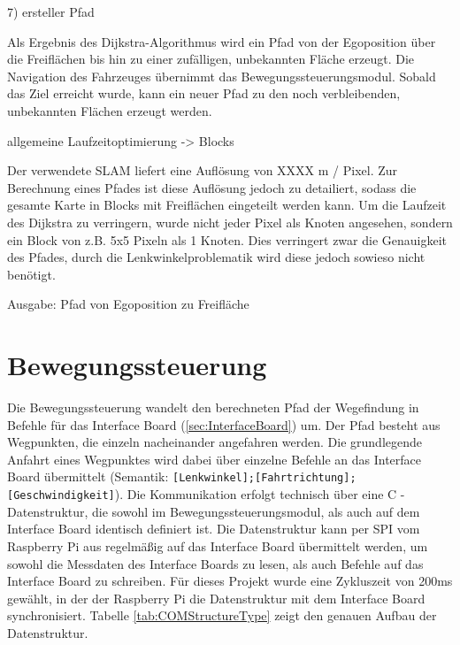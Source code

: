 7) ersteller Pfad

Als Ergebnis des Dijkstra-Algorithmus wird ein Pfad von der Egoposition über die Freiflächen bis hin zu einer zufälligen, unbekannten Fläche erzeugt. Die Navigation des Fahrzeuges übernimmt das Bewegungssteuerungsmodul. Sobald das Ziel erreicht wurde, kann ein neuer Pfad zu den noch verbleibenden, unbekannten Flächen erzeugt werden.



allgemeine Laufzeitoptimierung -> Blocks

Der verwendete SLAM liefert eine Auflösung von XXXX m / Pixel. Zur Berechnung eines Pfades ist diese Auflösung jedoch zu detailiert, sodass die gesamte Karte in Blocks mit Freiflächen eingeteilt werden kann. Um die Laufzeit des Dijkstra zu verringern, wurde nicht jeder Pixel als Knoten angesehen, sondern ein Block von z.B. 5x5 Pixeln als 1 Knoten. Dies verringert zwar die Genauigkeit des Pfades, durch die Lenkwinkelproblematik wird diese jedoch sowieso nicht benötigt.



Ausgabe:
Pfad von Egoposition zu Freifläche





\section{Bewegungssteuerung}
Die Bewegungssteuerung wandelt den berechneten Pfad der Wegefindung in Befehle für das Interface Board (\ref{sec:InterfaceBoard}) um. Der Pfad besteht aus Wegpunkten, die einzeln nacheinander angefahren werden. Die grundlegende Anfahrt eines Wegpunktes wird dabei über einzelne Befehle an das Interface Board übermittelt (Semantik: \texttt{[Lenkwinkel];[Fahrtrichtung];[Geschwindigkeit]}). Die Kommunikation erfolgt technisch über eine C - Datenstruktur, die sowohl im Bewegungssteuerungsmodul, als auch auf dem Interface Board identisch definiert ist. Die Datenstruktur kann per SPI vom Raspberry Pi aus regelmäßig auf das Interface Board übermittelt werden, um sowohl die Messdaten des Interface Boards zu lesen, als auch Befehle auf das Interface Board zu schreiben. Für dieses Projekt wurde eine Zykluszeit von 200ms gewählt, in der der Raspberry Pi die Datenstruktur mit dem Interface Board synchronisiert. Tabelle \ref{tab:COMStructureType} zeigt den genauen Aufbau der Datenstruktur.

